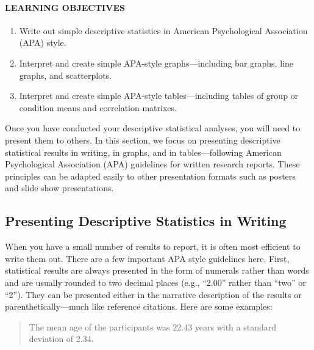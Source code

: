 \documentclass[
]{krantz}
\providecommand{\tightlist}{%
  \setlength{\itemsep}{0pt}\setlength{\parskip}{0pt}}
\begin{document}
\hypertarget{learning-objectives-37}{%
\paragraph*{LEARNING OBJECTIVES}\label{learning-objectives-37}}

\begin{enumerate}
\def\labelenumi{\arabic{enumi}.}
\tightlist
\item
  Write out simple descriptive statistics in American Psychological Association (APA) style.
\item
  Interpret and create simple APA-style graphs---including bar graphs, line graphs, and scatterplots.
\item
  Interpret and create simple APA-style tables---including tables of group or condition means and correlation matrixes.
\end{enumerate}

Once you have conducted your descriptive statistical analyses, you will need to present them to others. In this section, we focus on presenting descriptive statistical results in writing, in graphs, and in tables---following American Psychological Association (APA) guidelines for written research reports. These principles can be adapted easily to other presentation formats such as posters and slide show presentations.

\hypertarget{presenting-descriptive-statistics-in-writing}{%
\subsection*{Presenting Descriptive Statistics in Writing}\label{presenting-descriptive-statistics-in-writing}}


When you have a small number of results to report, it is often most efficient to write them out. There are a few important APA style guidelines here. First, statistical results are always presented in the form of numerals rather than words and are usually rounded to two decimal places (e.g., ``2.00'' rather than ``two'' or ``2''). They can be presented either in the narrative description of the results or parenthetically---much like reference citations. Here are some examples:

\begin{quote}
The mean age of the participants was 22.43 years with a standard deviation of 2.34.
\end{quote}
\end{document}
